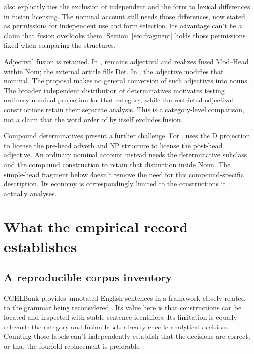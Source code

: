 \documentclass[12pt]{article}
\begin{document}
\textcite{Payne2007} also explicitly ties the exclusion of independent  and the form  to lexical differences in fusion licensing. The nominal account still needs those differences, now stated as permissions for independent use and form selection. Its advantage can't be a claim that fusion overlooks them. Section~\ref{sec:fragment} holds those permissions fixed when comparing the structures.

Adjectival fusion is retained. In ,  remains adjectival and realizes fused Mod--Head within Nom; the external article fills Det. In , the adjective  modifies that nominal. The proposal makes no general conversion of such adjectives into nouns. The broader independent distribution of determinatives motivates testing ordinary nominal projection for that category, while the restricted adjectival constructions retain their separate analysis. This is a category-level comparison, not a claim that the word order of  by itself excludes fusion.

Compound determinatives present a further challenge. For , \textcite{Payne2007} uses the D projection to license the pre-head adverb and NP structure to license the post-head adjective. An ordinary nominal account instead needs the determinative subclass and the compound construction to retain that distinction inside Noun. The simple-head fragment below doesn't remove the need for this compound-specific description. Its economy is correspondingly limited to the constructions it actually analyses.

\section{What the empirical record establishes}\label{sec:empirical}

\subsection{A reproducible corpus inventory}

CGELBank provides annotated English sentences in a framework closely related to the grammar being reconsidered \citep{reynolds2023unified}. Its value here is that constructions can be located and inspected with stable sentence identifiers. Its limitation is equally relevant: the category and fusion labels already encode analytical decisions. Counting those labels can't independently establish that the decisions are correct, or that the fourfold replacement is preferable.
\end{document}
